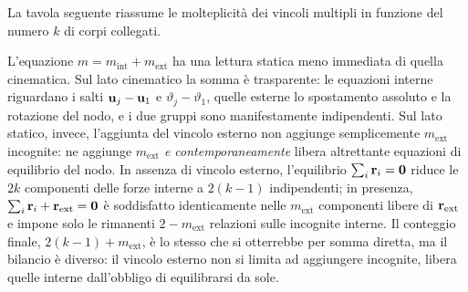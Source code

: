 \medskip

\noindent
La tavola seguente riassume le molteplicità dei vincoli
multipli in funzione del numero $k$ di corpi collegati.

\begin{table}[H]
	\centering
	\caption[Molteplicità dei vincoli multipli]{%
		Molteplicità dei vincoli che collegano $k$ corpi
		simultaneamente in un punto $A$, con eventuale vincolo
		esterno che collega il nodo al suolo.}
	\label{tab:vincoli_multipli}
\end{table}

\begin{oss}
	L'equazione $m = m_\text{int} + m_\text{ext}$ ha una
	lettura statica meno immediata di quella cinematica.
	Sul lato cinematico la somma è trasparente: le
	equazioni interne riguardano i salti
	$\mathbf{u}_j - \mathbf{u}_1$ e $\vartheta_j - \vartheta_1$, quelle
	esterne lo spostamento assoluto e la rotazione del
	nodo, e i due gruppi sono manifestamente indipendenti.
	Sul lato statico, invece, l'aggiunta del vincolo
	esterno non aggiunge semplicemente $m_\text{ext}$
	incognite: ne aggiunge $m_\text{ext}$ \emph{e
		contemporaneamente} libera altrettante equazioni di
	equilibrio del nodo. In assenza di vincolo esterno,
	l'equilibrio $\sum_i \mathbf{r}_i = \mathbf{0}$ riduce le $2k$
	componenti delle forze interne a $2(k-1)$ indipendenti;
	in presenza, $\sum_i \mathbf{r}_i + \mathbf{r}_\text{ext} = \mathbf{0}$
	è soddisfatto identicamente nelle $m_\text{ext}$
	componenti libere di $\mathbf{r}_\text{ext}$ e impone solo le
	rimanenti $2 - m_\text{ext}$ relazioni sulle incognite
	interne. Il conteggio finale, $2(k-1) + m_\text{ext}$,
	è lo stesso che si otterrebbe per somma diretta, ma il
	bilancio è diverso: il vincolo esterno non si limita ad
	aggiungere incognite, libera quelle interne dall'obbligo
	di equilibrarsi da sole.
\end{oss}

